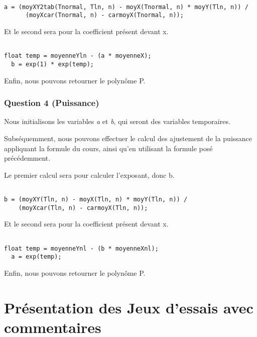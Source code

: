 \documentclass[letter]{article}
\begin{document}
\begin{verbatim}

a = (moyXY2tab(Tnormal, Tln, n) - moyX(Tnormal, n) * moyY(Tln, n)) /
      (moyXcar(Tnormal, n) - carmoyX(Tnormal, n));

\end{verbatim}

Et le second sera pour la coefficient présent devant x.


\begin{verbatim}

float temp = moyenneYln - (a * moyenneX);
  b = exp(1) * exp(temp);

\end{verbatim}

Enfin, nous pouvons retourner le polynôme P.



\subsubsection{Question 4 (Puissance)}
\label{sec:org00e22eb}

Nous initialisons les variables \emph{a} et \emph{b}, qui seront des variables temporaires.


Subséquemment, nous pouvons effectuer le calcul des ajustement de la puissance appliquant la formule du cours, ainsi qu'en utilisant la formule posé précédemment.

Le premier calcul sera pour calculer l'exposant, donc b.

\begin{verbatim}

b = (moyXY(Tln, n) - moyX(Tln, n) * moyY(Tln, n)) /
    (moyXcar(Tln, n) - carmoyX(Tln, n));

\end{verbatim}

Et le second sera pour la coefficient présent devant x.


\begin{verbatim}

float temp = moyenneYnl - (b * moyenneXnl);
  a = exp(temp);

\end{verbatim}

Enfin, nous pouvons retourner le polynôme P.

\section{Présentation des Jeux d'essais avec commentaires}
\label{sec:org2c75375}
\end{document}
